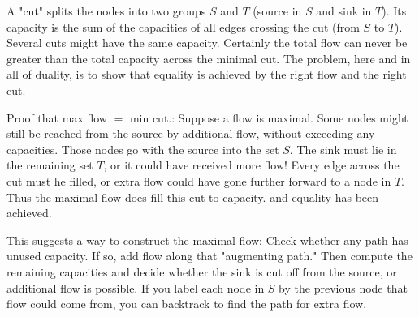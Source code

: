 A "cut" splits the nodes into two groups \(S\) and \(T\) (source in \(S\) and sink in \(T\)). Its capacity is the sum of the capacities of all edges crossing the cut (from \(S\) to \(T\)). Several cuts might have the same capacity. Certainly the total flow can never be greater than the total capacity across the minimal cut. The problem, here and in all of duality, is to show that equality is achieved by the right flow and the right cut.

Proof that max flow \(=\) min cut.: Suppose a flow is maximal. Some nodes might still be reached from the source by additional flow, without exceeding any capacities. Those nodes go with the source into the set \(S\). The sink must lie in the remaining set \(T\), or it could have received more flow! Every edge across the cut must he filled, or extra flow could have gone further forward to a node in \(T\). Thus the maximal flow does fill this cut to capacity. and equality has been achieved. 

This suggests a way to construct the maximal flow: Check whether any path has unused capacity. If so, add flow along that "augmenting path." Then compute the remaining capacities and decide whether the sink is cut off from the source, or additional flow is possible. If you label each node in \(S\) by the previous node that flow could come from, you can backtrack to find the path for extra flow.

 